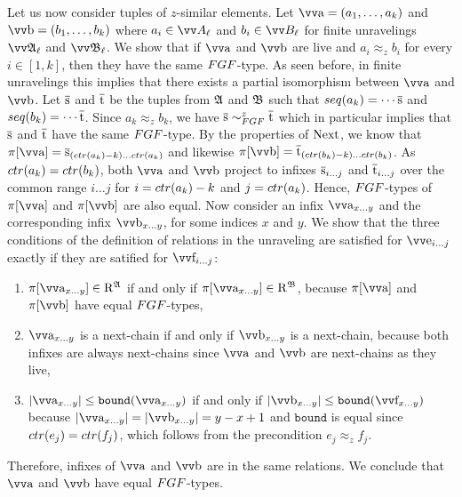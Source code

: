 Let us now consider tuples of $z$-similar elements.
Let $\elemtuptuplea = (a_{1}, \ldots, a_{k})$ and $\elemtuptupleb = (b_{1}, \ldots, b_{k})$ where $a_{i} \in \unraveldom{A}_{\ell}$ and $b_{i} \in \unraveldom{B}_{\ell}$ for finite unravelings $\unravel{A}_{\ell}$ and $\unravel{B}_{\ell}$.
We show that if $\elemtuptuplea$ and $\elemtuptupleb$ are live and $a_{i} \approx_{z} b_{i}$ for every $i \in [1,k]$, then they have the same $\FGF$-type.
As seen before, in finite unravelings this implies that there exists a partial isomorphism between $\elemtuptuplea$ and $\elemtuptupleb$.
Let $\overline{\mathrm{s}}$ and $\overline{\mathrm{t}}$ be the tuples from ${\mathfrak{A}}$ and ${\mathfrak{B}}$ such that $\seq{a_{k}} = \cdots \elemtuples$ and $\seq{b_{k}} = \cdots \elemtuplet$.
Since $a_{k} \approx_z b_{k}$, we have $\elemtuples \bisimto_{\FGF}^{z} \elemtuplet$ which in particular implies that $\overline{\mathrm{s}}$ and $\overline{\mathrm{t}}$ have the same $\FGF$-type.
By the properties of $\mathrm{Next}$, we know that $\pi[\elemtuptuplea] = \elemtuples_{(\ctr{a_{k}}-k)\ldots{}\ctr{a_{k}}}$ and likewise $\pi[\elemtuptupleb] = \elemtuplet_{(\ctr{b_{k}}-k)\ldots{}\ctr{b_{k}}}$.
As $\ctr{a_{k}} = \ctr{b_{k}}$, both $\elemtuptuplea$ and $\elemtuptupleb$ project to infixes $\overline{\mathrm{s}}_{i\ldots{}j}$ and $\overline{\mathrm{t}}_{i\ldots{}j}$ over the common range $i\ldots{}j$ for $i = \ctr{a_{k}} - k$ and $j = \ctr{a_{k}}$.
Hence, $\FGF$-types of $\pi[\elemtuptuplea]$ and $\pi[\elemtuptupleb]$ are also equal.
Now consider an infix $\elemtuptuplea_{x\ldots{}y}$ and the corresponding infix $\elemtuptupleb_{x\ldots{}y}$, for some indices $x$ and $y$.
We show that the three conditions of the definition of relations in the unraveling are satisfied for $\elemtuptuplee_{i\ldots{}j}$ exactly if they are satified for $\elemtuptuplef_{i\ldots{}j}$:
\begin{enumerate}
  \item $\pi[\elemtuptuplea_{x\ldots{}y}] \in \relR^{\str{A}}$ if and only if $\pi[\elemtuptuplea_{x\ldots{}y}] \in \relR^{\str{B}}$, because $\pi[\elemtuptuplea]$ and $\pi[\elemtuptupleb]$ have equal $\FGF$-types,
  \item $\elemtuptuplea_{x\ldots{}y}$ is a next-chain if and only if $\elemtuptupleb_{x\ldots{}y}$ is a next-chain, because both infixes are always next-chains since $\elemtuptuplea$ and $\elemtuptupleb$ are next-chains as they live,
  \item $|\elemtuptuplea_{x\ldots{}y}| \le \mathtt{bound}(\elemtuptuplea_{x\ldots{}y})$ if and only if $|\elemtuptupleb_{x\ldots{}y}| \le \mathtt{bound}(\elemtuptuplef_{x\ldots{}y})$ because $|\elemtuptuplea_{x\ldots{}y}| = |\elemtuptupleb_{x\ldots{}y}| = y-x+1$ and $\mathtt{bound}$ is equal since $\ctr{e_{j}} = \ctr{f_{j}}$, which follows from the precondition $e_{j} \approx_{z} f_{j}$.
\end{enumerate}
Therefore, infixes of $\elemtuptuplea$ and $\elemtuptupleb$ are in the same relations.
We conclude that $\elemtuptuplea$ and $\elemtuptupleb$ have equal $\FGF$-types.

